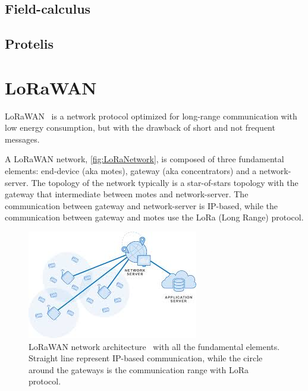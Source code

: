 



\subsection{Field-calculus}
\subsection{Protelis}

\section{LoRaWAN}
LoRaWAN~\cite{loraalliancetechnicalcommittee2020} is a network protocol optimized for long-range communication with low energy consumption, but with the drawback of short and not frequent messages.

A LoRaWAN network, \autoref{fig:LoRaNetwork}, is composed of three fundamental elements: end-device (aka motes), gateway (aka concentrators) and a network-server. 
% 
The topology of the network typically is a star-of-stars topology with the gateway that intermediate between motes and network-server.
% 
The communication between gateway and network-server is IP-based, while the communication between gateway and motes use the LoRa (Long Range) protocol.

\begin{figure}[h]
    \centering
    \includegraphics{figures/lora_architecture2.png}
    \caption{LoRaWAN network architecture~\cite{muntasirjoarder2020} with all the fundamental elements. Straight line represent IP-based communication, while the circle around the gateways is the communication range with LoRa protocol.}
    \label{fig:LoRaNetwork}
\end{figure}

